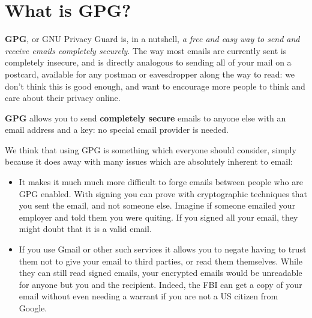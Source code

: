 

\section{What is GPG?}

\textbf{GPG}, or GNU Privacy Guard is, in a nutshell, \textit{a free and easy way to send and receive emails completely securely}. The way most emails are currently sent is completely insecure, and is directly analogous to sending all of your mail on a postcard, available for any postman or eavesdropper along the way to read: we don't think this is good enough, and want to encourage more people to think and care about their privacy online.

\textbf{GPG} allows you to send \textbf{completely secure} emails to anyone else with an email address and a key: no special email provider is needed.

We think that using GPG is something which everyone should consider, simply because it does away with many issues which are absolutely inherent to email:

\begin{itemize}
	\item It makes it much much more difficult to forge emails between people who are GPG enabled. With signing you can prove with cryptographic techniques that you sent the email, and not someone else. Imagine if someone emailed your employer and told them you were quiting. If you signed all your email, they might doubt that it is a valid email.
	\item If you use Gmail or other such services it allows you to negate having to trust them not to give your email to third parties, or read them themselves. While they can still read signed emails, your encrypted emails would be unreadable for anyone but you and the recipient. Indeed, the FBI can get a copy of your email without even needing a warrant if you are not a US citizen from Google.  
\end{itemize}

